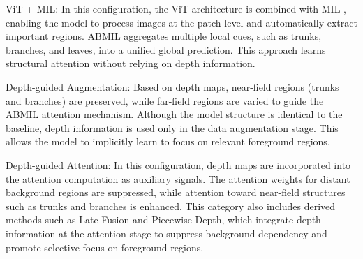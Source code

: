\documentclass{article}
\begin{document}
	ViT + MIL:
In this configuration, the ViT architecture \cite{ref1} is combined with MIL \cite{ref2}, enabling the model to process images at the patch level and automatically extract important regions. ABMIL aggregates multiple local cues, such as trunks, branches, and leaves, into a unified global prediction.
This approach learns structural attention without relying on depth information.

	Depth-guided Augmentation:
Based on depth maps, near-field regions (trunks and branches) are preserved, while far-field regions are varied to guide the ABMIL attention mechanism. Although the model structure is identical to the baseline, depth information is used only in the data augmentation stage. This allows the model to implicitly learn to focus on relevant foreground regions.

	Depth-guided Attention:
In this configuration, depth maps are incorporated into the attention computation as auxiliary signals. The attention weights for distant background regions are suppressed, while attention toward near-field structures such as trunks and branches is enhanced. This category also includes derived methods such as Late Fusion and Piecewise Depth, which integrate depth information at the attention stage to suppress background dependency and promote selective focus on foreground regions.
\end{document}
